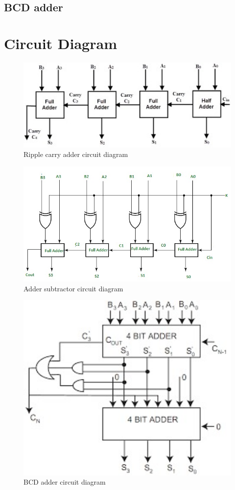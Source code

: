 \documentclass[titlepage]{article}
\begin{document}
    
    \subsection{BCD adder}


    \section{Circuit Diagram}
    \begin{figure}[!ht]
        \centering
        \includegraphics[width=12cm]{./figures/ripple_carry_cd.jpeg}
        \caption{Ripple carry adder circuit diagram}
    \end{figure}
    \begin{figure}[!ht]
        \centering
        \includegraphics[width=12cm]{./figures/adder_sub_cd.jpeg}
        \caption{Adder subtractor circuit diagram}
    \end{figure}
    \begin{figure}[!ht]
        \centering
        \includegraphics[width=12cm]{./figures/bcd_cd.jpeg}
        \caption{BCD adder circuit diagram}
    \end{figure}
    
\end{document}
